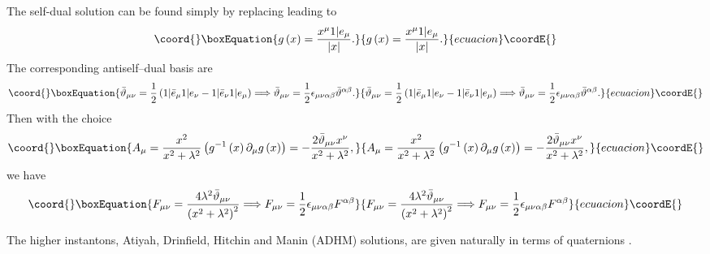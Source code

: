\documentclass[a4paper,12pt]{book}
\begin{document}
The self-dual solution \coordHE{} can be found simply by replacing \coordHE{} leading to 
\begin{equation}\coord{}\boxEquation{
g\left( x\right) =\frac{x^{\mu }1|e_{\mu }}{\left| x\right| }.
}{
g\left( x\right) =\frac{x^{\mu }1|e_{\mu }}{\left| x\right| }.
}{ecuacion}\coordE{}\end{equation}
The corresponding \coordHE{} antiself--dual basis are 
\begin{equation}\coord{}\boxEquation{
\bar{\vartheta}_{\mu \nu }=\frac{1}{2}\left( 1|\bar{e}_{\mu }1|e_{\nu }-1|
\bar{e}_{\nu }1|e_{\mu }\right) \Longrightarrow \bar{\vartheta}_{\mu \nu }=
\frac{1}{2}\epsilon _{\mu \nu \alpha \beta }\bar{\vartheta}^{\alpha \beta }.
}{
\bar{\vartheta}_{\mu \nu }=\frac{1}{2}\left( 1|\bar{e}_{\mu }1|e_{\nu }-1|
\bar{e}_{\nu }1|e_{\mu }\right) \Longrightarrow \bar{\vartheta}_{\mu \nu }=
\frac{1}{2}\epsilon _{\mu \nu \alpha \beta }\bar{\vartheta}^{\alpha \beta }.
}{ecuacion}\coordE{}\end{equation}
Then with the choice 
\begin{equation}\coord{}\boxEquation{
A_{\mu }=\frac{x^{2}}{x^{2}+\lambda ^{2}}\left( g^{-1}\left( x\right)
\partial _{\mu }g\left( x\right) \right) =-\frac{2\bar{\Bbb{\vartheta }}
_{\mu \nu }x^{\nu }}{x^{2}+\lambda ^{2}},
}{
A_{\mu }=\frac{x^{2}}{x^{2}+\lambda ^{2}}\left( g^{-1}\left( x\right)
\partial _{\mu }g\left( x\right) \right) =-\frac{2\bar{\Bbb{\vartheta }}
_{\mu \nu }x^{\nu }}{x^{2}+\lambda ^{2}},
}{ecuacion}\coordE{}\end{equation}
we have 
\begin{equation}\coord{}\boxEquation{
F_{\mu \nu }=\frac{4\lambda ^{2}\bar{\Bbb{\vartheta }}_{\mu \nu }}{\left(
x^{2}+\lambda ^{2}\right) ^{2}}\Longrightarrow F_{\mu \nu }=\frac{1}{2}
\epsilon _{\mu \nu \alpha \beta }F^{\alpha \beta }
}{
F_{\mu \nu }=\frac{4\lambda ^{2}\bar{\Bbb{\vartheta }}_{\mu \nu }}{\left(
x^{2}+\lambda ^{2}\right) ^{2}}\Longrightarrow F_{\mu \nu }=\frac{1}{2}
\epsilon _{\mu \nu \alpha \beta }F^{\alpha \beta }
}{ecuacion}\coordE{}\end{equation}

The higher \coordHE{} instantons, Atiyah, Drinfield, Hitchin and Manin (ADHM)
solutions, are given naturally in terms of quaternions \cite{adhm}.
\end{document}
